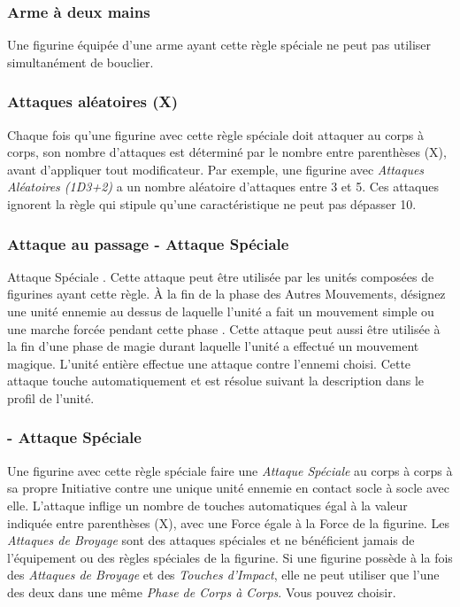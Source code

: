 \subsubsection*{Arme à deux mains}

Une figurine équipée d’une arme ayant cette règle spéciale ne peut pas utiliser simultanément de bouclier.


\subsubsection*{Attaques aléatoires (X)}

Chaque fois qu'une figurine avec cette règle spéciale doit attaquer au corps à corps, son nombre d'attaques est déterminé par le nombre entre parenthèses (X), avant d'appliquer tout modificateur. Par exemple, une figurine avec \emph{Attaques Aléatoires (1D3+2)} a un nombre aléatoire d'attaques entre 3 et 5. Ces attaques ignorent la règle qui stipule qu'une caractéristique ne peut pas dépasser 10.

\subsubsection*{Attaque au passage - Attaque Spéciale}

Attaque Spéciale . Cette attaque peut être utilisée par les unités composées de figurines ayant cette règle. À la fin de la phase des Autres Mouvements, désignez une unité ennemie  au dessus de laquelle l'unité a fait un mouvement simple ou une marche forcée pendant cette phase . Cette attaque peut aussi être utilisée à la fin d'une phase de magie durant laquelle l'unité a effectué un mouvement magique. L'unité entière effectue une attaque contre l'ennemi choisi. Cette attaque touche automatiquement et est résolue suivant la description dans le profil de l'unité.

\subsubsection*{ - Attaque Spéciale}

Une figurine avec cette règle spéciale  faire une \emph{Attaque Spéciale} au corps à corps à sa propre Initiative contre une unique unité ennemie en contact socle à socle avec elle. L'attaque inflige un nombre de touches automatiques égal à la valeur indiquée entre parenthèses (X), avec une Force égale à la Force de la figurine. Les \emph{Attaques de Broyage} sont des attaques spéciales et ne bénéficient jamais de l'équipement ou des règles spéciales de la figurine. Si une figurine possède à la fois des \emph{Attaques de Broyage} et des \emph{Touches d'Impact}, elle ne peut utiliser que l'une des deux dans une même \emph{Phase de Corps à Corps}. Vous pouvez choisir.

